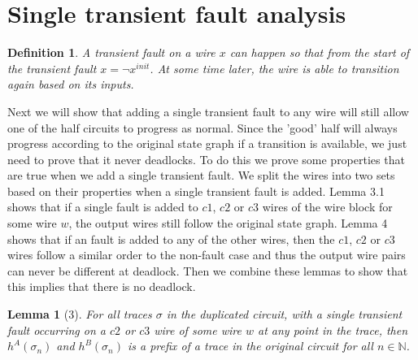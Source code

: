 \documentclass[12pt]{report}
\newtheorem*{definition}{Definition}
\newtheorem*{lemma}{Lemma}
\begin{document}
\section{Single transient fault analysis}
\begin{definition}A transient fault on a wire $x$ can happen so that from the start of the transient fault $x= \lnot x^{init}$.  At some time later, the wire is able to transition again based on its inputs. %
\end{definition}
Next we will show that adding a single transient fault to any wire will still allow one of the half circuits to progress as normal.  Since the 'good' half will always progress according to the original state graph if a transition is available, we just need to prove that it never deadlocks.  To do this we prove some properties that are true when we add a single transient fault.  We split the wires into two sets based on their properties when a single transient fault is added.  Lemma 3.1 shows that if a single fault is added to $c1$, $c2$ or $c3$ wires of the wire block for some wire $w$, the output wires still follow the original state graph.  Lemma 4 shows that if an fault is added to any of the other wires, then the $c1$, $c2$ or $c3$ wires follow a similar order to the non-fault case and thus the output wire pairs can never be different at deadlock.  Then we combine these lemmas to show that this implies that there is no deadlock.
\begin{lemma}[3]
For all traces $\sigma$ in the duplicated circuit, with a single transient fault occurring on a $c2$ or $c3$ wire of some wire $w$ at any point in the trace, then $h^{A}(\sigma_n)$ and $h^{B}(\sigma_n)$ is a prefix of a trace in the original circuit for all $n \in \mathbb{N}$.
\end{lemma}
\end{document}
